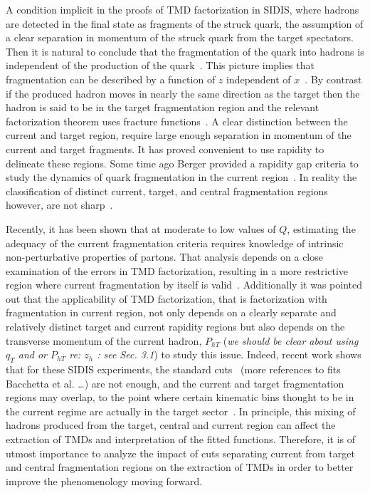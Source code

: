 \documentclass[final,3p,times,onecolumn,sort&compress,hidelinks]{elsarticle}
\newcommand\3[1]{\boldsymbol{#1}}
\begin{document}
 A condition implicit in the proofs of TMD factorization in SIDIS,
 where hadrons are detected in the final state as fragments of the
 struck quark, the assumption of  a clear separation in momentum of the struck quark from the target spectators.  Then it is natural to conclude that the fragmentation of the quark into hadrons is independent of the production of the quark~\cite{Berger:1987zu,Mulders:2000jt,Joosten:2013mia}. This picture
 implies that fragmentation can be described by a function of $z$ independent of $x$~\cite{Berger:1987zu}.  By contrast if the produced hadron moves in nearly the same direction as the target then the hadron is said to be in the target fragmentation region and the relevant factorization theorem uses fracture functions~\cite{ Trentadue:1993ka,Grazzini:1997ih,Anselmino:2011ss}.  
 A clear distinction between the current and target  region, require large enough separation in momentum of the current and target fragments.  It has proved  convenient to use rapidity to delineate these regions.   Some time ago Berger provided a rapidity gap criteria  to study the dynamics of quark fragmentation in the current region~\cite{Berger:1987zu,Mulders:2000jt}.  In reality the classification of distinct current, target, and central fragmentation regions however, are not sharp~\cite{Berger:1987zu,Mulders:2000jt,Joosten:2013mia,Boglione:2016bph,Collins:2018teg}.

 Recently, it has been shown that at moderate to low values of $Q$, estimating the adequacy of the current fragmentation criteria requires knowledge of intrinsic non-perturbative properties of partons. That analysis depends on a close examination of the errors in TMD factorization, resulting in
 a more restrictive region where current fragmentation by itself is valid~\cite{Boglione:2016bph}.
   Additionally it was pointed out that the applicability of TMD factorization, that is factorization  with fragmentation in  current region, not only depends on a clearly separate and relatively distinct target and current rapidity regions but also depends on the transverse momentum of the current hadron, $P_{hT}$ ({\em we should be clear about using $q_T$ and or $P_{hT}$ re: $z_h$ : see Sec. 3.1})  
 to study this issue.  Indeed, recent work shows that for these SIDIS experiments, the standard cuts~\cite{Anselmino:2013lza} (more references to fits Bacchetta et al. \dots)
   are not enough, and the current and target fragmentation regions may overlap, to the point where certain kinematic bins thought to be in the current regime are actually in the target sector~\cite{Boglione:2016bph}.  In principle, this mixing of hadrons produced from the target, central and current region can affect the extraction of TMDs and interpretation of the fitted functions.
  Therefore, it is of utmost importance to analyze the impact of cuts separating current from target and central fragmentation regions on the extraction of TMDs in order to better improve the phenomenology moving forward.
\end{document}
